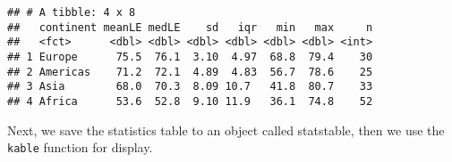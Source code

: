 \documentclass[
]{book}
\newenvironment{Shaded}{\begin{snugshade}}{\end{snugshade}}
\newcommand{\CommentTok}[1]{\textcolor[rgb]{0.56,0.35,0.01}{\textit{#1}}}
\newcommand{\DataTypeTok}[1]{\textcolor[rgb]{0.13,0.29,0.53}{#1}}
\newcommand{\DecValTok}[1]{\textcolor[rgb]{0.00,0.00,0.81}{#1}}
\newcommand{\KeywordTok}[1]{\textcolor[rgb]{0.13,0.29,0.53}{\textbf{#1}}}
\newcommand{\NormalTok}[1]{#1}
\newcommand{\OperatorTok}[1]{\textcolor[rgb]{0.81,0.36,0.00}{\textbf{#1}}}
\newcommand{\OtherTok}[1]{\textcolor[rgb]{0.56,0.35,0.01}{#1}}
\newcommand{\StringTok}[1]{\textcolor[rgb]{0.31,0.60,0.02}{#1}}
\begin{document}
\begin{Shaded}
\end{Shaded}

\begin{verbatim}
## # A tibble: 4 x 8
##   continent meanLE medLE    sd   iqr   min   max     n
##   <fct>      <dbl> <dbl> <dbl> <dbl> <dbl> <dbl> <int>
## 1 Europe      75.5  76.1  3.10  4.97  68.8  79.4    30
## 2 Americas    71.2  72.1  4.89  4.83  56.7  78.6    25
## 3 Asia        68.0  70.3  8.09 10.7   41.8  80.7    33
## 4 Africa      53.6  52.8  9.10 11.9   36.1  74.8    52
\end{verbatim}

Next, we save the statistics table to an object called statstable, then we use the \texttt{kable} function for display.
\end{document}
